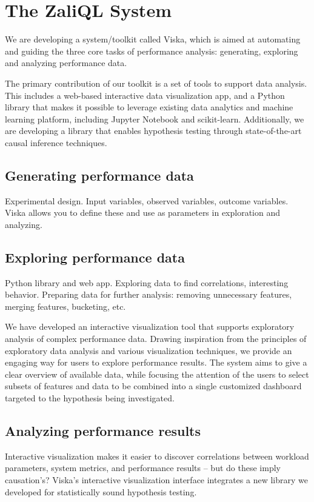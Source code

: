 
\section{The ZaliQL System}

We are developing a system/toolkit called Viska, which is aimed at automating
and guiding the three core tasks of performance analysis: generating,
exploring and analyzing performance data.

The primary contribution of our toolkit is a set of tools to support
data analysis.
This includes a web-based interactive data visualization app, and a
Python library that makes it possible to leverage existing data
analytics and machine learning platform, including Jupyter Notebook
and scikit-learn.
Additionally, we are developing a
library that enables hypothesis testing through state-of-the-art causal inference
techniques. %

\subsection{Generating performance data}
Experimental design. Input variables, observed variables, outcome variables.
Viska allows you to define these and use as parameters in exploration and
analyzing.

\subsection{Exploring performance data}
Python library and web app. Exploring data to find correlations, interesting
behavior. Preparing data for further analysis: removing unnecessary features,
merging features, bucketing, etc.

We have developed an interactive visualization
tool that supports exploratory analysis of complex performance
data. Drawing inspiration from the principles of exploratory
data analysis and various visualization techniques,
we provide an engaging way for users to explore performance
results. The system aims to give a clear overview
of available data, while focusing the attention of the users to
select subsets of features and data to be combined into a single
customized dashboard targeted to the hypothesis being
investigated.

\subsection{Analyzing performance results}
Interactive visualization makes it easier to discover correlations
between workload parameters, system metrics, and performance results
-- but do these imply causation's? Viska's
interactive visualization interface integrates a new library we
developed for statistically sound hypothesis testing.

